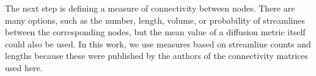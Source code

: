 The next step is defining a measure of connectivity between nodes. There are many options, such as the number, length, volume, or probability of streamlines between the corresponding nodes, but the mean value of a diffusion metric itself could also be used. \cite{yeh_mapping_2021} In this work, we use measures based on streamline counts and lengths because these were published by the authors of the connectivity matrices used here.


